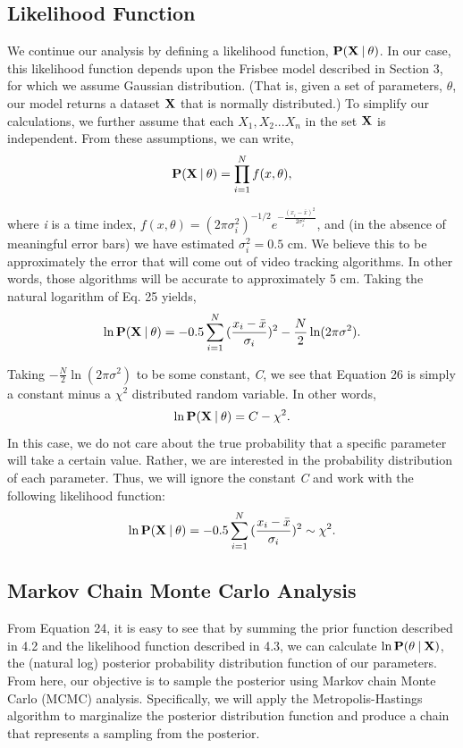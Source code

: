 \documentclass[a4paper,12pt, oneside]{article}
\newcommand\givenbase[1][]{\:#1\lvert\:}
\let\given\givenbase
\begin{document}
\subsection{Likelihood Function}

We continue our analysis by defining a likelihood function, $\bold{P({X}\given\theta})$. In our case, this likelihood function depends upon the Frisbee model described in Section 3, for which we assume Gaussian distribution. (That is, given a set of parameters, $\theta$, our model returns a dataset $\bold{X}$ that is normally distributed.) To simplify our calculations, we further assume that each $X_1, X_2...X_n$ in the set $\bold{X}$ is independent.  From these assumptions, we can write, 
\begin{equation}
\bold{P({X}\given\theta)}={\prod_{i=1}^{N} f(x,\theta)},
\end{equation}

where \textit{i} is a time index, $f(x,\theta)=(2\pi\sigma_{i}^2)^{-1/2}e^{-\frac{(x_{i}-\bar{x})^2}{2\sigma_i^2}}$, and (in the absence of meaningful error bars) we have estimated $\sigma_i^2=0.5$ cm.  We believe this to be approximately the error that will come out of video tracking algorithms. In other words, those algorithms will be accurate to approximately 5 cm. Taking the natural logarithm of Eq. 25 yields,
\begin{equation}
\ln\bold{P({X}\given\theta)}={-0.5 \sum_{i=1}^{N} {(\frac { x_i-\bar{x} } {\sigma_{i}}})^2} - \frac{N}{2}\ln(2\pi\sigma^2).
\end{equation}

Taking $-\frac{N}{2}\ln(2\pi\sigma^2)$ to be some constant, \textit{C}, we see that Equation 26 is simply a constant minus a $\chi^2$ distributed random variable. In other words, 
\begin{equation*}
\ln\bold{P({X}\given\theta)}=C-\chi^2.
\end{equation*}
In this case, we do not care about the true probability that a specific parameter will take a certain value. Rather, we are interested in the probability distribution of each parameter. Thus, we will ignore the constant \textit{C} and work with the following likelihood function:
\begin{equation}
\ln\bold{P({X}\given\theta)}={-0.5 \sum_{i=1}^{N} {(\frac { x_i-\bar{x} } {\sigma_{i}}})^2} \sim \chi^2.
\end{equation}
\subsection{Markov Chain Monte Carlo Analysis}
From Equation 24, it is easy to see that by summing the prior function described in 4.2 and the likelihood function described in 4.3, we can calculate $\ln\bold{P}(\theta\given\bold{X})$, the (natural log) posterior probability distribution function of our parameters. From here, our objective is to sample the posterior using Markov chain Monte Carlo (MCMC) analysis. Specifically, we will apply the Metropolis-Hastings algorithm to marginalize the posterior distribution function and produce a chain that represents a sampling from the posterior.
\end{document}
